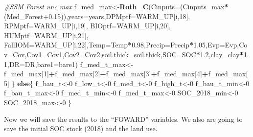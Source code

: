 \documentclass[
  10pt,
  b5paper,
]{book}
\newenvironment{Shaded}{\begin{snugshade}}{\end{snugshade}}
\newcommand{\CommentTok}[1]{\textcolor[rgb]{0.56,0.35,0.01}{\textit{#1}}}
\newcommand{\ControlFlowTok}[1]{\textcolor[rgb]{0.13,0.29,0.53}{\textbf{#1}}}
\newcommand{\DataTypeTok}[1]{\textcolor[rgb]{0.13,0.29,0.53}{#1}}
\newcommand{\DecValTok}[1]{\textcolor[rgb]{0.00,0.00,0.81}{#1}}
\newcommand{\FloatTok}[1]{\textcolor[rgb]{0.00,0.00,0.81}{#1}}
\newcommand{\KeywordTok}[1]{\textcolor[rgb]{0.13,0.29,0.53}{\textbf{#1}}}
\newcommand{\NormalTok}[1]{#1}
\newcommand{\OperatorTok}[1]{\textcolor[rgb]{0.81,0.36,0.00}{\textbf{#1}}}
\begin{document}
\begin{Shaded}
\begin{Highlighting}[]
\CommentTok{#SSM Forest unc max}
\NormalTok{f_med_max<-}\KeywordTok{Roth_C}\NormalTok{(}\DataTypeTok{Cinputs=}\NormalTok{(Cinputs_max}\OperatorTok{*}\NormalTok{(Med_Forest}\FloatTok{+0.15}\NormalTok{)),}\DataTypeTok{years=}\NormalTok{years,}\DataTypeTok{DPMptf=}\NormalTok{WARM_UP[i,}\DecValTok{18}\NormalTok{], }\DataTypeTok{RPMptf=}\NormalTok{WARM_UP[i,}\DecValTok{19}\NormalTok{], }\DataTypeTok{BIOptf=}\NormalTok{WARM_UP[i,}\DecValTok{20}\NormalTok{], }\DataTypeTok{HUMptf=}\NormalTok{WARM_UP[i,}\DecValTok{21}\NormalTok{], }\DataTypeTok{FallIOM=}\NormalTok{WARM_UP[i,}\DecValTok{22}\NormalTok{],}\DataTypeTok{Temp=}\NormalTok{Temp}\OperatorTok{*}\FloatTok{0.98}\NormalTok{,}\DataTypeTok{Precip=}\NormalTok{Precip}\OperatorTok{*}\FloatTok{1.05}\NormalTok{,}\DataTypeTok{Evp=}\NormalTok{Evp,}\DataTypeTok{Cov=}\NormalTok{Cov,}\DataTypeTok{Cov1=}\NormalTok{Cov1,}\DataTypeTok{Cov2=}\NormalTok{Cov2,}\DataTypeTok{soil.thick=}\NormalTok{soil.thick,}\DataTypeTok{SOC=}\NormalTok{SOC}\OperatorTok{*}\FloatTok{1.2}\NormalTok{,}\DataTypeTok{clay=}\NormalTok{clay}\OperatorTok{*}\FloatTok{1.1}\NormalTok{,}\DataTypeTok{DR=}\NormalTok{DR,}\DataTypeTok{bare1=}\NormalTok{bare1)}
\NormalTok{f_med_t_max<-f_med_max[}\DecValTok{1}\NormalTok{]}\OperatorTok{+}\NormalTok{f_med_max[}\DecValTok{2}\NormalTok{]}\OperatorTok{+}\NormalTok{f_med_max[}\DecValTok{3}\NormalTok{]}\OperatorTok{+}\NormalTok{f_med_max[}\DecValTok{4}\NormalTok{]}\OperatorTok{+}\NormalTok{f_med_max[}\DecValTok{5}\NormalTok{]}
\NormalTok{\}}
\ControlFlowTok{else}\NormalTok{\{}
\NormalTok{f_bau_t<-}\DecValTok{0}
\NormalTok{f_low_t<-}\DecValTok{0}
\NormalTok{f_med_t<-}\DecValTok{0}
\NormalTok{f_high_t<-}\DecValTok{0}
\NormalTok{f_bau_t_min<-}\DecValTok{0}
\NormalTok{f_bau_t_max<-}\DecValTok{0}
\NormalTok{f_med_t_min<-}\DecValTok{0}
\NormalTok{f_med_t_max<-}\DecValTok{0}
\NormalTok{SOC_}\DecValTok{2018}\NormalTok{_min<-}\DecValTok{0}
\NormalTok{SOC_}\DecValTok{2018}\NormalTok{_max<-}\DecValTok{0}
\NormalTok{\}}
\end{Highlighting}
\end{Shaded}

Now we will save the results to the ``FOWARD'' variables. We also are going to save the initial SOC stock (2018) and the land use.
\end{document}
